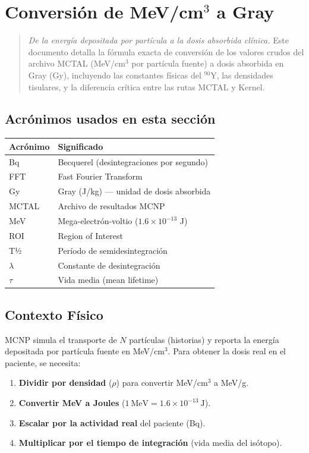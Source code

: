 \documentclass[12pt,a4paper]{article}
\begin{document}
\section{Conversión de MeV/cm$^3$ a Gray}

\begin{quote}
\textit{De la energía depositada por partícula a la dosis absorbida clínica.} Este documento detalla la fórmula exacta de conversión de los valores crudos del archivo MCTAL (MeV/cm$^3$ por partícula fuente) a dosis absorbida en Gray (Gy), incluyendo las constantes físicas del $^{90}$Y, las densidades tisulares, y la diferencia crítica entre las rutas MCTAL y Kernel.
\end{quote}

\subsection*{Acrónimos usados en esta sección}

\begin{tabular}{p{3cm} p{12cm}}
\toprule
\textbf{Acrónimo} & \textbf{Significado} \\
\midrule
Bq & Becquerel (desintegraciones por segundo) \\
FFT & Fast Fourier Transform \\
Gy & Gray (J/kg) --- unidad de dosis absorbida \\
MCTAL & Archivo de resultados MCNP \\
MeV & Mega-electrón-voltio ($1.6\times10^{-13}$ J) \\
ROI & Region of Interest \\
T½ & Período de semidesintegración \\
$\lambda$ & Constante de desintegración \\
$\tau$ & Vida media (mean lifetime) \\
\bottomrule
\end{tabular}

\subsection{Contexto Físico}

MCNP simula el transporte de $N$ partículas (historias) y reporta la energía depositada por partícula fuente en MeV/cm$^3$. Para obtener la dosis real en el paciente, se necesita:

\begin{enumerate}
  \item \textbf{Dividir por densidad} ($\rho$) para convertir MeV/cm$^3$ a MeV/g.
  \item \textbf{Convertir MeV a Joules} ($1\ \text{MeV} = 1.6\times10^{-13}\ \text{J}$).
  \item \textbf{Escalar por la actividad real} del paciente (Bq).
  \item \textbf{Multiplicar por el tiempo de integración} (vida media del isótopo).
\end{enumerate}
\end{document}
